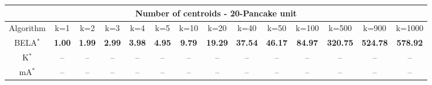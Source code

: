\begin{tabular}{c|ccccccccccccc}\toprule
\multicolumn{14}{c}{Number of centroids - 20-Pancake unit}\\ \midrule
Algorithm & k=1 & k=2 & k=3 & k=4 & k=5 & k=10 & k=20 & k=40 & k=50 & k=100 & k=500 & k=900 & k=1000 \\ \midrule
BELA$^*$ & \textbf{1.00} & \textbf{1.99} & \textbf{2.99} & \textbf{3.98} & \textbf{4.95} & \textbf{9.79} & \textbf{19.29} & \textbf{37.54} & \textbf{46.17} & \textbf{84.97} & \textbf{320.75} & \textbf{524.78} & \textbf{578.92} \\
K$^*$ & -- & -- & -- & -- & -- & -- & -- & -- & -- & -- & -- & -- & -- \\
mA$^*$ & -- & -- & -- & -- & -- & -- & -- & -- & -- & -- & -- & -- & -- \\ \bottomrule 
\end{tabular}

